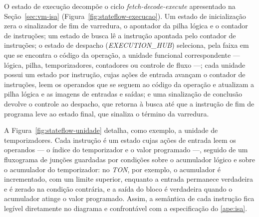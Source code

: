 O estado de execução decompõe o ciclo \textit{fetch-decode-execute} apresentado na Seção~\ref{sec:vm-isa} (Figura~\ref{fig:stateflow-execucao}).
Um estado de inicialização zera o sinalizador de fim de varredura, o apontador da pilha lógica e o contador de instruções; um estado de busca lê a instrução apontada pelo contador de instruções; o estado de despacho (\textit{EXECUTION\_HUB}) seleciona, pela faixa em que se encontra o código da operação, a unidade funcional correspondente --- lógica, pilha, temporizadores, contadores ou controle de fluxo ---; cada unidade possui um estado por instrução, cujas ações de entrada avançam o contador de instruções, leem os operandos que se seguem ao código da operação e atualizam a pilha lógica e as imagens de entradas e saídas; e uma sinalização de conclusão devolve o controle ao despacho, que retorna à busca até que a instrução de fim de programa leve ao estado final, que sinaliza o término da varredura.

\begin{figurafixa}
    \centering
    \label{fig:stateflow-execucao}

\end{figurafixa}

A Figura~\ref{fig:stateflow-unidade} detalha, como exemplo, a unidade de temporizadores.
Cada instrução é um estado cujas ações de entrada leem os operandos --- o índice do temporizador e o valor programado ---, seguido de um fluxograma de junções guardadas por condições sobre o acumulador lógico e sobre o acumulador do temporizador: no \textit{TON}, por exemplo, o acumulador é incrementado, com um limite superior, enquanto a entrada permanece verdadeira e é zerado na condição contrária, e a saída do bloco é verdadeira quando o acumulador atinge o valor programado.
Assim, a semântica de cada instrução fica legível diretamente no diagrama e confrontável com a especificação do \ref{ape:isa}.

\begin{figurafixa}
    \centering
    \label{fig:stateflow-unidade}

\end{figurafixa}

